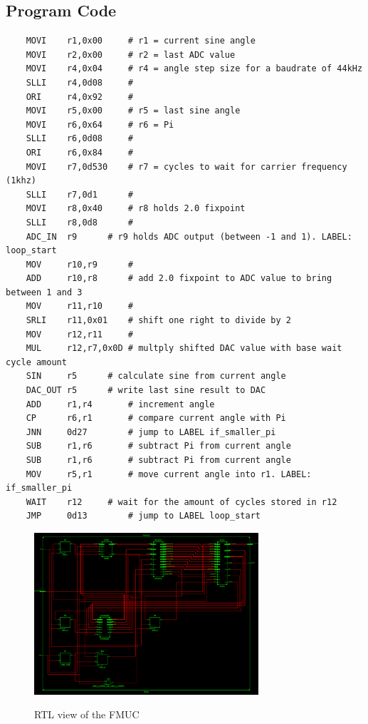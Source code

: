 \subsection{Program Code}
\begin{adjustwidth}{-4.3cm}{}
	\begin{lstlisting}
	MOVI	r1,0x00		# r1 = current sine angle
	MOVI	r2,0x00		# r2 = last ADC value
	MOVI 	r4,0x04		# r4 = angle step size for a baudrate of 44kHz
	SLLI	r4,0d08		# 
	ORI 	r4,0x92		# 
	MOVI	r5,0x00		# r5 = last sine angle
	MOVI	r6,0x64		# r6 = Pi
	SLLI	r6,0d08		# 
	ORI 	r6,0x84		# 
	MOVI	r7,0d530	# r7 = cycles to wait for carrier frequency (1khz)
	SLLI	r7,0d1		# 
	MOVI	r8,0x40		# r8 holds 2.0 fixpoint
	SLLI	r8,0d8		# 
	ADC_IN  r9		# r9 holds ADC output (between -1 and 1). LABEL: loop_start
	MOV 	r10,r9		# 
	ADD 	r10,r8		# add 2.0 fixpoint to ADC value to bring between 1 and 3
	MOV     r11,r10		# 
	SRLI    r11,0x01	# shift one right to divide by 2
	MOV     r12,r11		# 
	MUL     r12,r7,0x0D	# multply shifted DAC value with base wait cycle amount
	SIN 	r5		# calculate sine from current angle
	DAC_OUT	r5		# write last sine result to DAC
	ADD 	r1,r4		# increment angle
	CP  	r6,r1		# compare current angle with Pi
	JNN 	0d27		# jump to LABEL if_smaller_pi
	SUB 	r1,r6		# subtract Pi from current angle
	SUB 	r1,r6		# subtract Pi from current angle
	MOV 	r5,r1		# move current angle into r1. LABEL: if_smaller_pi
	WAIT	r12		# wait for the amount of cycles stored in r12
	JMP 	0d13		# jump to LABEL loop_start
	\end{lstlisting}
\end{adjustwidth}

\begin{landscape}
	\begin{figure}[H] 
		\scalebox{2.6} %
		{\includegraphics[height=6cm]{images/block_diagramm_rtl.jpg}} %
		\caption{RTL view of the FMUC} 
		\label{fig:block} %
	\end{figure} 
\end{landscape}




 
